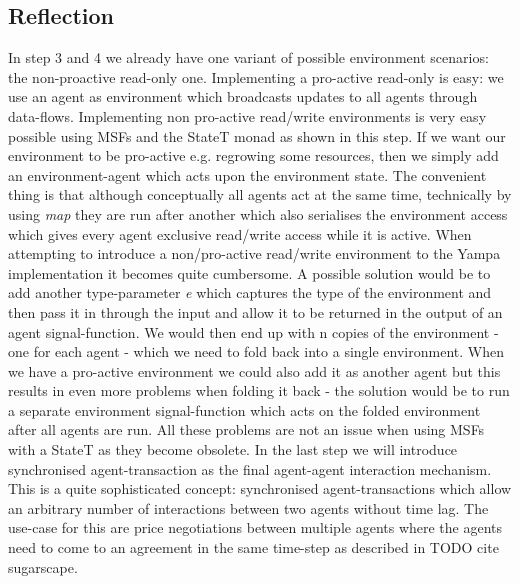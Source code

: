 \subsection{Reflection}
In step 3 and 4 we already have one variant of possible environment scenarios: the non-proactive read-only one. Implementing a pro-active read-only is easy: we use an agent as environment which broadcasts updates to all agents through data-flows. Implementing non pro-active read/write environments is very easy possible using MSFs and the StateT monad as shown in this step. If we want our environment to be pro-active e.g. regrowing some resources, then we simply add an environment-agent which acts upon the environment state. The convenient thing is that although conceptually all agents act at the same time, technically by using \textit{map} they are run after another which also serialises the environment access which gives every agent exclusive read/write access while it is active.
When attempting to introduce a non/pro-active read/write environment to the Yampa implementation it becomes quite cumbersome. A possible solution would be to add another type-parameter \textit{e} which captures the type of the environment and then pass it in through the input and allow it to be returned in the output of an agent signal-function. We would then end up with n copies of the environment - one for each agent - which we need to fold back into a single environment. When we have a pro-active environment we could also add it as another agent but this results in even more problems when folding it back - the solution would be to run a separate environment signal-function which acts on the folded environment after all agents are run. All these problems are not an issue when using MSFs with a StateT as they become obsolete.
In the last step we will introduce synchronised agent-transaction as the final agent-agent interaction mechanism. This is a quite sophisticated concept: synchronised agent-transactions which allow an arbitrary number of interactions between two agents without time lag. The use-case for this are price negotiations between multiple agents where the agents need to come to an agreement in the same time-step as described in TODO cite sugarscape.